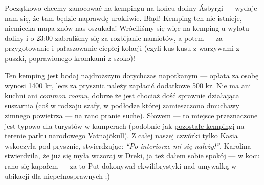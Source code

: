 
Początkowo chcemy zanocować na kempingu na końcu doliny Ásbyrgi --- wydaje nam się, że tam będzie naprawdę urokliwie. Błąd! Kemping ten nie istnieje, niemiecka mapa znów nas oszukała! Wróciliśmy się więc na kemping u wylotu doliny i o 23:00 zabraliśmy się za rozbijanie namiotów, a potem --- za przygotowanie i pałaszowanie ciepłej kolacji (czyli kus-kusu z warzywami z puszki, poprawionego kromkami z szoko)!

Ten kemping jest bodaj najdroższym dotychczas napotkanym --- opłata za osobę wynosi 1400 kr, lecz za prysznic należy zapłacić dodatkowe 500 kr. Nie ma ani kuchni ani \emph{common roomu}, dobrze że jest chociaż dość sprawnie działająca suszarnia (coś w rodzaju szafy, w podłodze której zamieszczono dmuchawy zimnego powietrza --- na rano pranie suche). Słowem --- to miejsce przeznaczone jest typowo dla turystów w kamperach (podobnie jak \href{http://www.vatnajokulsthjodgardur.is/english/plan-your-visit/camping/}{pozostałe kempingi} na terenie parku narodowego Vatnajökull). Z całej naszej czwórki tylko Kasia wskoczyła pod prysznic, stwierdzając: \emph{“Po interiorze mi się należy!”}. Karolina stwierdziła, że już się myła wczoraj  w Dreki, ja też dałem sobie spokój --- w kocu rano się kąpałem --- za to Put dokonywał ekwilibrystyki nad umywalką w ubikacji dla niepełnosprawnych ;)

